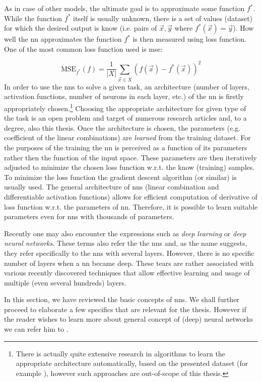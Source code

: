 As in case of other  models, the ultimate goal is to
approximate some function $f^*$. While the function $f^*$ itself is usually
unknown, there is a set of values (dataset) for which the desired output is know
(i.e. pairs of $\vec{x}, \vec{y}$ where $f^*(\vec{x}) = \vec{y}$). How well
the \gls{nn} approximates the function $f^*$ is then measured using loss
function. One of the most common loss function used is \gls{mse}:

$$\text{MSE}_{f^*}(f) = \frac{1}{|X|} \sum_{\vec{x} \in X} (f(\vec{x}) - f^*(\vec{x}))^2$$
In order to use the \glspl{nn} to solve a given task, an architecture (number
of layers, activation functions, number of neurons in each layer, etc.) of the
\gls{nn} is firstly appropriately chosen.\footnote{There is actually quite
extensive research in algorithms to learn the appropriate architecture
automatically, based on the presented dataset (for example \cite{neat}),
however such approaches are out-of-scope of this thesis.} Choosing the
appropriate architecture for given type of the task is an open problem and
target of numerous research articles and, to a degree, also this thesis. Once
the architecture is chosen, the parameters (e.g. coefficient of the linear
combinations) are \emph{learned} from the training dataset. For the purposes
of the training the \gls{nn} is perceived as a function of its parameters
rather then the function of the input space. These parameters are then
iteratively adjusted to minimize the chosen loss function w.r.t. the know
(training) samples. To minimize the loss function the gradient descent
algorithm (or similar) is usually used. The general architecture of \glspl{nn}
(linear combination and differentiable activation functions) allows for
efficient computation of derivative of loss function w.r.t. the parameters of
\gls{nn}. Therefore, it is possible to learn suitable parameters even for
\glspl{nn} with thousands of parameters.

Recently one may also encounter the expressions such as \emph{deep learning}
or \emph{deep neural networks}. These terms also refer the the \glspl{nn} and,
as the name suggests, they refer specifically to the \glspl{nn} with several
layers. However, there is no specific number of layers when a \gls{nn} became
deep. These tears are rather associated with various recently discovered
techniques that allow effective learning and usage of multiple (even several
hundreds) layers.

In this section, we have reviewed the basic concepts of \glspl{nn}. We shall
further proceed to elaborate a few specifics that are relevant for the thesis.
However if the reader wishes to learn more about general concept of (deep)
neural networks we can refer him to \cite{deeplearningbook}.

